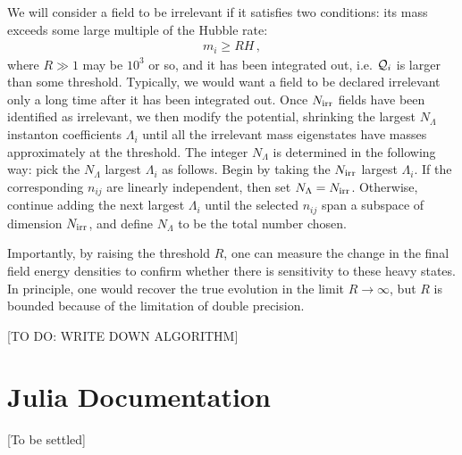 \documentclass[11pt]{article}
\begin{document}
We will consider a field to be irrelevant if it satisfies two conditions: its mass exceeds some large multiple of the Hubble rate:
\begin{align}
    m_i \geq R H\,,
\end{align}
where $R\gg1$ may be $10^3$ or so, and it has been integrated out, i.e. ${\cal Q}_i$ is larger than some threshold. Typically, we would want a field to be declared irrelevant only a long time after it has been integrated out. Once $N_{\rm irr}$ fields have been identified as irrelevant, we then modify the potential, shrinking the largest $N_\Lambda$ instanton coefficients $\Lambda_i$ until all the irrelevant mass eigenstates have masses approximately at the threshold. The integer $N_\Lambda$ is determined in the following way: pick the $N_{\Lambda}$ largest $\Lambda_i$ as follows. Begin by taking the $N_{\rm irr}$ largest $\Lambda_i$. If the corresponding $n_{ij}$ are linearly independent, then set $N_{\Lambda} = N_{\rm irr}$. Otherwise, continue adding the next largest $\Lambda_i$ until the selected $n_{ij}$ span a subspace of dimension $N_{\rm irr}$, and define $N_{\Lambda}$ to be the total number chosen.  


Importantly, by raising the threshold $R$, one can measure the change in the final field energy densities to confirm whether there is sensitivity to these heavy states. In principle, one would recover the true evolution in the limit $R\to\infty$, but $R$ is bounded because of the limitation of double precision.

[TO DO: WRITE DOWN ALGORITHM]

\section{Julia Documentation}\label{sec:documentation}
[To be settled]


\end{document}
